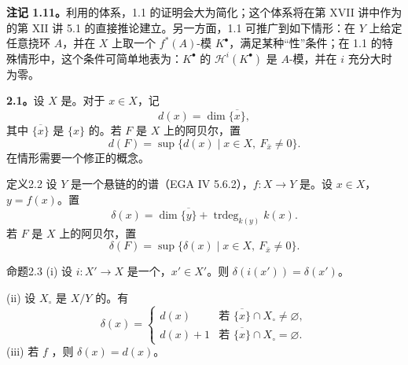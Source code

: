 \textbf{注记 1.11。}利用的体系，1.1 的证明会大为简化；这个体系将在第 XVII 讲中作为的第 XII 讲 5.1 的直接推论建立。另一方面，1.1 可推广到如下情形：在 $Y$ 上给定任意挠环 $A$，并在 $X$ 上取一个 $f^*(A)$-模 $K^\bullet$，满足某种“性”条件；在 1.1 的特殊情形中，这个条件可简单地表为：$K^\bullet$ 的 $\mathcal H^i(K^\bullet)$ 是 $A$-模，并在 $i$ 充分大时为零。

\textbf{2.1。}设 $X$ 是。对于 $x\in X$，记
\[
d(x)=\dim\overline{\{x\}},\tag{2.1.1}
\]
其中 $\overline{\{x\}}$ 是 $\{x\}$ 的。若 $F$ 是 $X$ 上的阿贝尔，置
\[
d(F)=\sup\{d(x)\mid x\in X,\ F_{\bar x}\ne0\}.\tag{2.1.2}
\]
在情形需要一个修正的概念。
\begin{SGAresult}{定义}{2.2}
设 $Y$ 是一个悬链的的谱（EGA IV 5.6.2），$f:X\to Y$ 是。设 $x\in X$，$y=f(x)$。置
\[
\delta(x)=\dim\overline{\{y\}}+\operatorname{trdeg}_{k(y)}k(x).
\]
若 $F$ 是 $X$ 上的阿贝尔，置
\[
\delta(F)=\sup\{\delta(x)\mid x\in X,\ F_{\bar x}\ne0\}.
\]
\end{SGAresult}
\begin{SGAresult}{命题}{2.3}
(i) 设 $i:X'\to X$ 是一个，$x'\in X'$。则 $\delta(i(x'))=\delta(x')$。

(ii) 设 $X_\circ$ 是 $X/Y$ 的。有
\[
\delta(x)=\begin{cases}
d(x)&\text{若 }\overline{\{x\}}\cap X_\circ\ne\varnothing,\\
d(x)+1&\text{若 }\overline{\{x\}}\cap X_\circ=\varnothing.
\end{cases}
\]
(iii) 若 $f$ ，则 $\delta(x)=d(x)$。
\end{SGAresult}
